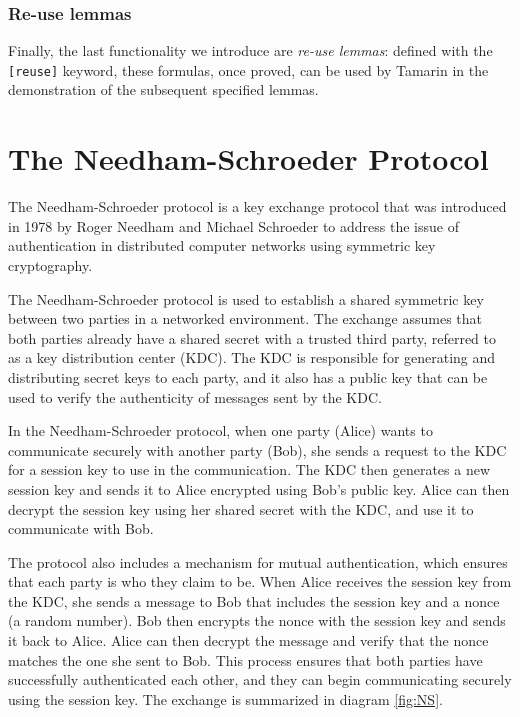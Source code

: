 \documentclass[fleqn,10pt]{SelfArx} %
\begin{document}
\subsubsection{Re-use lemmas}

Finally, the last functionality we introduce are \textit{re-use lemmas}: defined with the \lstinline|[reuse]| keyword, these formulas, once proved, can be used by Tamarin in the demonstration of the subsequent specified lemmas.

\section{The Needham-Schroeder Protocol}

The Needham-Schroeder protocol is a key exchange protocol that was introduced in 1978 by Roger Needham and Michael Schroeder \cite{needhamschroeder} to address the issue of authentication in distributed computer networks using symmetric key cryptography.

The Needham-Schroeder protocol is used to establish a shared symmetric key between two parties in a networked environment. The exchange assumes that both parties already have a shared secret with a trusted third party, referred to as a key distribution center (KDC). The KDC is responsible for generating and distributing secret keys to each party, and it also has a public key that can be used to verify the authenticity of messages sent by the KDC.

In the Needham-Schroeder protocol, when one party (Alice) wants to communicate securely with another party (Bob), she sends a request to the KDC for a session key to use in the communication. The KDC then generates a new session key and sends it to Alice encrypted using Bob's public key. Alice can then decrypt the session key using her shared secret with the KDC, and use it to communicate with Bob.

The protocol also includes a mechanism for mutual authentication, which ensures that each party is who they claim to be. When Alice receives the session key from the KDC, she sends a message to Bob that includes the session key and a nonce (a random number). Bob then encrypts the nonce with the session key and sends it back to Alice. Alice can then decrypt the message and verify that the nonce matches the one she sent to Bob. This process ensures that both parties have successfully authenticated each other, and they can begin communicating securely using the session key. The exchange is summarized in diagram \ref{fig:NS}.
\end{document}
